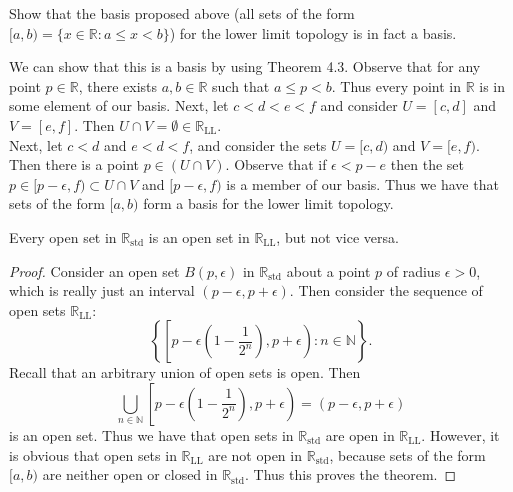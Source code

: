 \documentclass[a4paper,12pt,twoside]{hmcpset}
\begin{document}
\begin{exercise}[Exercise 4.4] Show that the basis proposed above (all sets of
the form $[a,b) = \{x \in \mathbb{R} : a \le x < b\}$) for the lower
limit topology is in fact a basis.
\end{exercise}

\begin{solution}
    We can show that this is a basis by using Theorem 4.3. Observe that
for any point $p \in \mathbb{R}$, there exists $a,b \in \mathbb{R}$
such that $a \le p < b$. Thus every point in $\mathbb{R}$ is in some
element of our basis. Next, let $c < d < e < f$ and consider $U = [c,
d]$ and $V = [e ,f]$. Then $U \cap V = \emptyset \in
\mathbb{R}_{\text{LL}}$.
\\
Next, let $c < d$ and $e < d < f$, and consider
the sets $U = [c, d)$ and $V = [e, f)$. Then there is a point $p \in
(U \cap V)$. Observe that if $\epsilon < p - e$ then the set $ 
p \in [p - \epsilon, f) \subset U \cap V$ and $[p - \epsilon, f)$ 
is a member of our
basis. Thus we have that sets of the form $[a, b)$ form a basis for
the lower limit topology. 

\end{solution}


\begin{problem}[Theorem 4.5] Every open set in $\mathbb{R}_\text{std}$
    is an open set in $\mathbb{R}_\text{LL}$, but not vice versa.
\end{problem}

\begin{proof}
    Consider an open set $B(p, \epsilon)$ in $\mathbb{R}_\text{std}$
    about a point $p$ of radius $\epsilon > 0$, which is really just
    an interval $(p - \epsilon, p + \epsilon)$. Then consider the
    sequence of open sets $\mathbb{R}_\text{LL}$:
    $$
    \left\{\left[p - \epsilon\left(1 - \frac{1}{2^n}\right), p + \epsilon\right) : n \in \mathbb{N}\right\}.
    $$
    Recall that an arbitrary union of open sets is open. Then
    $$
    \bigcup\limits_{n \in \mathbb{N}} 
    \left[p - \epsilon\left(1 - \frac{1}{2^n}\right), p + \epsilon\right)
    = (p - \epsilon, p + \epsilon)
    $$
    is an open set. Thus we have that open sets in
    $\mathbb{R}_\text{std}$ are open in $\mathbb{R}_\text{LL}$.
    However, it is obvious that open sets in $\mathbb{R}_\text{LL}$
    are not open in $\mathbb{R}_\text{std}$, because sets of the form
    $[a, b)$ are neither open or closed in $\mathbb{R}_\text{std}.$
    Thus this proves the theorem.
\end{proof}
\end{document}
